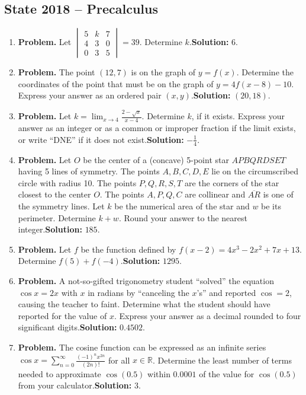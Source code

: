 \documentclass[10pt]{article}
\begin{document}
\subsection*{State 2018 -- Precalculus}
\begin{enumerate}
  \item \textbf{Problem.} Let $\begin{vmatrix}5&k&7\\4&3&0\\0&3&5\end{vmatrix}=39$. Determine $k$.\quad \textbf{Solution:} $6$.
  \item \textbf{Problem.} The point $(12,7)$ is on the graph of $y=f(x)$. Determine the coordinates of the point that must be on the graph of $y=4f(x-8)-10$. Express your answer as an ordered pair $(x,y)$.\quad \textbf{Solution:} $(20,18)$.
  \item \textbf{Problem.} Let $\displaystyle k=\lim_{x\to4}\frac{2-\sqrt{x}}{x-4}$. Determine $k$, if it exists. Express your answer as an integer or as a common or improper fraction if the limit exists, or write ``DNE'' if it does not exist.\quad \textbf{Solution:} $-\frac14$.
  \item \textbf{Problem.} Let $O$ be the center of a (concave) 5-point star $APBQRDSET$ having 5 lines of symmetry. The points $A,B,C,D,E$ lie on the circumscribed circle with radius 10. The points $P,Q,R,S,T$ are the corners of the star closest to the center $O$. The points $A,P,Q,C$ are collinear and $\overline{AR}$ is one of the symmetry lines. Let $k$ be the numerical area of the star and $w$ be its perimeter. Determine $k+w$. Round your answer to the nearest integer.\quad \textbf{Solution:} $185$.
  \item \textbf{Problem.} Let $f$ be the function defined by $f(x-2)=4x^3-2x^2+7x+13$. Determine $f(5)+f(-4)$.\quad \textbf{Solution:} $1295$.
  \item \textbf{Problem.} A not-so-gifted trigonometry student ``solved'' the equation $\cos x=2x$ with $x$ in radians by ``canceling the $x$'s'' and reported $\cos=2$, causing the teacher to faint. Determine what the student should have reported for the value of $x$. Express your answer as a decimal rounded to four significant digits.\quad \textbf{Solution:} $0.4502$.
  \item \textbf{Problem.} The cosine function can be expressed as an infinite series $\displaystyle\cos x=\sum_{n=0}^{\infty}\frac{(-1)^n x^{2n}}{(2n)!}$ for all $x\in\mathbb R$. Determine the least number of terms needed to approximate $\cos(0.5)$ within $0.0001$ of the value for $\cos(0.5)$ from your calculator.\quad \textbf{Solution:} $3$.

\end{enumerate}
\end{document}
